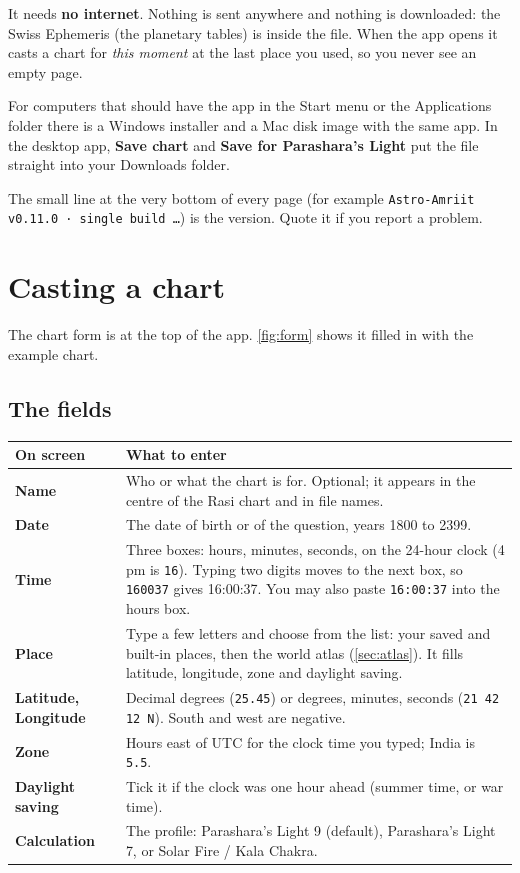\documentclass[11pt, a4paper]{article}
\newcommand{\shot}[1]{}
\newcommand{\PL}{Parashara's Light}
\newcommand{\ui}[1]{\textbf{\textsf{#1}}}   %
\newcommand{\ex}[1]{\texttt{#1}}             %
\begin{document}
It needs \textbf{no internet}. Nothing is sent anywhere and nothing is downloaded: the Swiss Ephemeris
(the planetary tables) is inside the file. When the app opens it casts a chart for \emph{this moment} at
the last place you used, so you never see an empty page.

For computers that should have the app in the Start menu or the Applications folder there is a Windows
installer and a Mac disk image with the same app. In the desktop app, \ui{Save chart} and
\ui{Save for Parashara's Light} put the file straight into your Downloads folder.

\begin{notebox}The small line at the very bottom of every page (for example \ex{Astro-Amriit v0.11.0 ·
single build …}) is the version. Quote it if you report a problem.\end{notebox}

\section{Casting a chart}
\label{sec:cast}
The chart form is at the top of the app. \autoref{fig:form} shows it filled in with the example chart.

\shot{form}

\subsection{The fields}
\begin{tabularx}{\linewidth}{>{\bfseries}l X}
\toprule
On screen & What to enter \\
\midrule
Name & Who or what the chart is for. Optional; it appears in the centre of the Rasi chart and in file names. \\
Date & The date of birth or of the question, years 1800 to 2399. \\
Time & Three boxes: hours, minutes, seconds, on the 24-hour clock (4 pm is \ex{16}). Typing two digits moves to the next box, so \ex{160037} gives 16:00:37. You may also paste \ex{16:00:37} into the hours box. \\
Place & Type a few letters and choose from the list: your saved and built-in places, then the world atlas (\autoref{sec:atlas}). It fills latitude, longitude, zone and daylight saving. \\
Latitude, Longitude & Decimal degrees (\ex{25.45}) or degrees, minutes, seconds (\ex{21 42 12 N}). South and west are negative. \\
Zone & Hours east of UTC for the clock time you typed; India is \ex{5.5}. \\
Daylight saving & Tick it if the clock was one hour ahead (summer time, or war time). \\
Calculation & The profile: \PL{} 9 (default), \PL{} 7, or Solar Fire / Kala Chakra. \\
\bottomrule
\end{tabularx}
\end{document}
